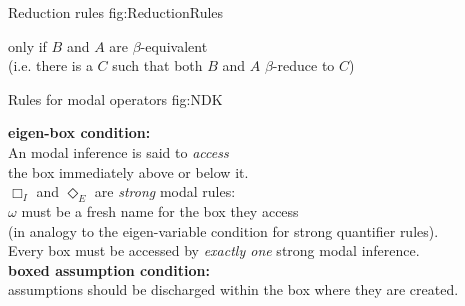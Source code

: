\documentclass[smallextended]{svjour3}
\newcommand{\nec}{\Box} %
\newcommand{\pos}{\Diamond} %
\begin{document}
\begin{calculus}
{Reduction rules}
{fig:ReductionRules}

\vspace{1em}

\qquad\qquad\qquad\qquad\qquad\qquad\qquad\qquad\qquad
{}

\vspace{1em}

\begin{center}

only if $B$ and $A$ are $\beta$-equivalent \\ (i.e. there is a $C$ such that both $B$ and $A$ $\beta$-reduce to $C$)

\end{center}

\vspace{1em}



\end{calculus}



\begin{calculus}
{Rules for modal operators}
{fig:NDK}

\vspace{1em}

\s\s\s\s\s\s
\infer[\nec_I]{\nec A}{\omega: \fbox{\infer*{A}{}} }
\s\s\s\s
\infer[\nec_E]{w: \fbox{ \infer*{}{A} } }{\nec A}

\vspace{2em}

\s\s\s\s\s\s
\infer[\pos_I]{\pos A}{w: \fbox{\infer*{A}{}} }
\s\s\s\s
\infer[\pos_E]{\omega: \fbox{ \infer*{}{A} } }{\pos A}

\vspace{1em}


\begin{center}
\textbf{eigen-box condition:}\\ 
An modal inference is said to \emph{access}\\
 the box immediately above or below it. \\
$\nec_I$ and $\pos_E$ are \emph{strong} modal rules: \\
$\omega$ must be a fresh name for the box they access \\ 
(in analogy to the eigen-variable condition for strong quantifier rules). \\
Every box must be accessed by \emph{exactly one} strong modal inference. \\
\vspace{0.5em}
\textbf{boxed assumption condition:} \\
assumptions should be discharged within the box where they are created.
\end{center}

\vspace{1em}

\end{calculus}
\end{document}
